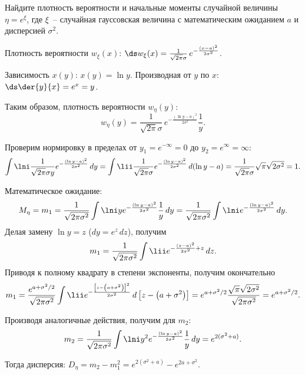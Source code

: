 \documentclass[pscyr]{hedwork}
\begin{document}
  \begin{task}{16}{
    Найдите плотность вероятности и начальные моменты случайной величины
    \( \eta = e^\xi \), где \( \xi \)~-- случайная гауссовская величина с
    математическим ожиданием \( a \) и дисперсией \( \sigma^2 \).
  }

    Плотность вероятности \( w_\xi(x) \):
    \( \ds
      w_\xi(x) = \frac{1}{\sqrt{2\pi}\sigma}\,e^{-\frac{(x - a)^2}{2\sigma^2}}
    \).

    Зависимость \( x(y) \): \( x(y) = \ln y \). Производная от \( y \) по
    \( x \): \( \ds \der{y}{x} = e^x = y \).

    Таким образом, плотность вероятности \( w_\eta(y) \):
    \[
      w_\eta(y) = \frac{1}{\sqrt{2\pi}\sigma}\,
        e^{-\frac{(\ln y - a)^2}{2\sigma^2}} \frac{1}{y}.
    \]

    Проверим нормировку в пределах от \( y_1 = e^{-\infty} = 0 \) до
    \( y_2 = e^\infty = \infty \):
    \[
      \int\lni \frac{1}{\sqrt{2\pi}\sigma y}
        e^{-\frac{(\ln y - a)^2}{2\sigma^2}}\,dy =
        \int\lii \frac{1}{\sqrt{2\pi}\sigma}
        e^{-\frac{(\ln y - a)^2}{2\sigma^2}}\,d(\ln y - a) =
        \frac{1}{\sqrt{2\pi}\sigma} \sqrt{\pi}\sqrt{2\sigma^2} = 1.
    \]

    Математическое ожидание:
    \[
      M_\eta = m_1 = \frac{1}{\sqrt{2\pi\sigma^2}} \int\lni y
        e^{-\frac{(\ln y - a)^2}{2\sigma^2}}\frac{1}{y}\,dy =
        \frac{1}{\sqrt{2\pi\sigma^2}}
        \int\lni e^{-\frac{(\ln y - a)^2}{2\sigma^2}}\,dy.
    \]
    Делая замену \( \ln y = z \) (\( dy = e^z\,dz \)), получим
    \[
      m_1 = \frac{1}{\sqrt{2\pi\sigma^2}}
        \int\lii e^{-\frac{(z - a)^2}{2\sigma^2} + z}\,dz.
    \]
    Приводя к полному квадрату в степени экспоненты, получим окончательно
    \[
      m_1 = \frac{e^{a + \sigma^2 / 2}}{\sqrt{2\pi\sigma^2}}
        \int\lii e^{-\frac{\left[z - \left(a + \sigma^2\right)\right]^2}
        {2\sigma^2}}\,d\left[z - \left(a + \sigma^2\right)\right] =
        e^{a + \sigma^2 / 2}
        \frac{\sqrt{\pi}\sqrt{2\sigma^2}}{\sqrt{2\pi\sigma^2}} =
        e^{a + \sigma^2 / 2}.
    \]

    Производя аналогичные действия, получим для \( m_2 \):
    \[
      m_2 = \frac{1}{\sqrt{2\pi\sigma^2}}
        \int\lni y^2 e^{-\frac{(\ln y - a)^2}{2\sigma^2}}\frac{1}{y}\,dy =
        e^{2(\sigma^2 + a)}.
    \]

    Тогда дисперсия: \( D_\eta = m_2 - m_1^2 = e^{2(\sigma^2 + a)} -
    e^{2a + \sigma^2} \).

  \end{task}
\end{document}
